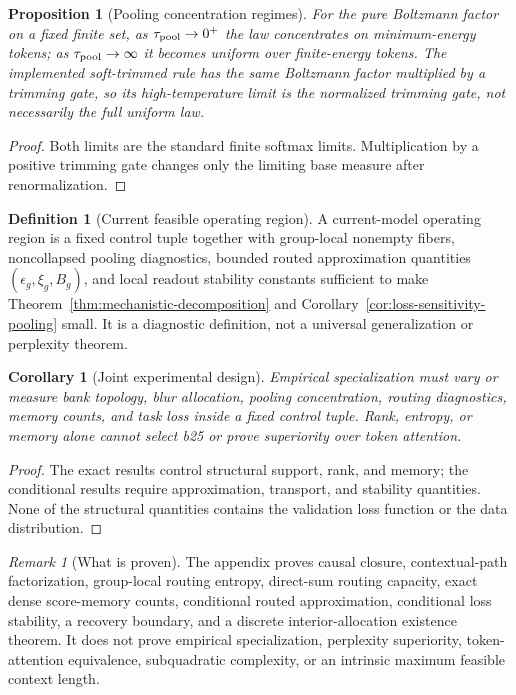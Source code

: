 \documentclass{article}
\theoremstyle{plain}
\newtheorem{proposition}[theorem]{Proposition}
\newtheorem{corollary}[theorem]{Corollary}
\theoremstyle{definition}
\newtheorem{definition}[theorem]{Definition}
\theoremstyle{remark}
\newtheorem{remark}[theorem]{Remark}
\begin{document}
\begin{proposition}[Pooling concentration regimes]
\label{prop:pooling-concentration-regimes}
For the pure Boltzmann factor on a fixed finite set, as $\tau_{\rm pool}\to0^+$ the law concentrates on minimum-energy tokens; as $\tau_{\rm pool}\to\infty$ it becomes uniform over finite-energy tokens.  The implemented soft-trimmed rule has the same Boltzmann factor multiplied by a trimming gate, so its high-temperature limit is the normalized trimming gate, not necessarily the full uniform law.
\end{proposition}
\begin{proof}
Both limits are the standard finite softmax limits.  Multiplication by a positive trimming gate changes only the limiting base measure after renormalization.
\end{proof}

\begin{definition}[Current feasible operating region]
\label{def:feasible-operating-region}
A current-model operating region is a fixed control tuple together with group-local nonempty fibers, noncollapsed pooling diagnostics, bounded routed approximation quantities $(\epsilon_g,\xi_g,B_g)$, and local readout stability constants sufficient to make Theorem~\ref{thm:mechanistic-decomposition} and Corollary~\ref{cor:loss-sensitivity-pooling} small.  It is a diagnostic definition, not a universal generalization or perplexity theorem.
\end{definition}

\begin{corollary}[Joint experimental design]
\label{cor:joint-experimental-design}
Empirical specialization must vary or measure bank topology, blur allocation, pooling concentration, routing diagnostics, memory counts, and task loss inside a fixed control tuple.  Rank, entropy, or memory alone cannot select b25 or prove superiority over token attention.
\end{corollary}
\begin{proof}
The exact results control structural support, rank, and memory; the conditional results require approximation, transport, and stability quantities.  None of the structural quantities contains the validation loss function or the data distribution.
\end{proof}

\begin{remark}[What is proven]
\label{rem:what-is-proven}
The appendix proves causal closure, contextual-path factorization, group-local routing entropy, direct-sum routing capacity, exact dense score-memory counts, conditional routed approximation, conditional loss stability, a recovery boundary, and a discrete interior-allocation existence theorem.  It does not prove empirical specialization, perplexity superiority, token-attention equivalence, subquadratic complexity, or an intrinsic maximum feasible context length.
\end{remark}
\end{document}
